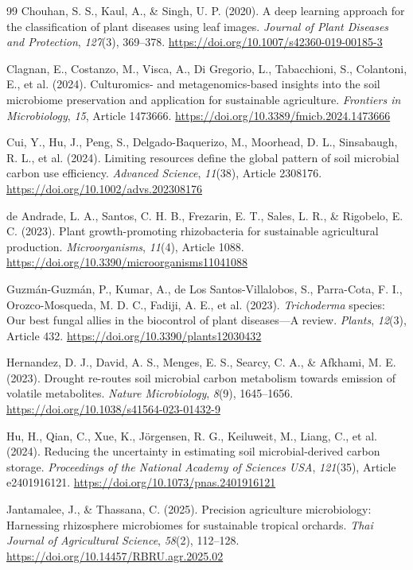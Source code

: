 \begin{thebibliography}{99}
 Chouhan, S. S., Kaul, A., \& Singh, U. P. (2020). A deep learning approach for the classification of plant diseases using leaf images. \textit{Journal of Plant Diseases and Protection}, \textit{127}(3), 369--378. \url{https://doi.org/10.1007/s42360-019-00185-3}

 Clagnan, E., Costanzo, M., Visca, A., Di Gregorio, L., Tabacchioni, S., Colantoni, E., et al. (2024). Culturomics- and metagenomics-based insights into the soil microbiome preservation and application for sustainable agriculture. \textit{Frontiers in Microbiology}, \textit{15}, Article 1473666. \url{https://doi.org/10.3389/fmicb.2024.1473666}

 Cui, Y., Hu, J., Peng, S., Delgado-Baquerizo, M., Moorhead, D. L., Sinsabaugh, R. L., et al. (2024). Limiting resources define the global pattern of soil microbial carbon use efficiency. \textit{Advanced Science}, \textit{11}(38), Article 2308176. \url{https://doi.org/10.1002/advs.202308176}

 de Andrade, L. A., Santos, C. H. B., Frezarin, E. T., Sales, L. R., \& Rigobelo, E. C. (2023). Plant growth-promoting rhizobacteria for sustainable agricultural production. \textit{Microorganisms}, \textit{11}(4), Article 1088. \url{https://doi.org/10.3390/microorganisms11041088}

 Guzmán-Guzmán, P., Kumar, A., de Los Santos-Villalobos, S., Parra-Cota, F. I., Orozco-Mosqueda, M. D. C., Fadiji, A. E., et al. (2023). \textit{Trichoderma} species: Our best fungal allies in the biocontrol of plant diseases---A review. \textit{Plants}, \textit{12}(3), Article 432. \url{https://doi.org/10.3390/plants12030432}

 Hernandez, D. J., David, A. S., Menges, E. S., Searcy, C. A., \& Afkhami, M. E. (2023). Drought re-routes soil microbial carbon metabolism towards emission of volatile metabolites. \textit{Nature Microbiology}, \textit{8}(9), 1645--1656. \url{https://doi.org/10.1038/s41564-023-01432-9}

 Hu, H., Qian, C., Xue, K., Jörgensen, R. G., Keiluweit, M., Liang, C., et al. (2024). Reducing the uncertainty in estimating soil microbial-derived carbon storage. \textit{Proceedings of the National Academy of Sciences USA}, \textit{121}(35), Article e2401916121. \url{https://doi.org/10.1073/pnas.2401916121}

 Jantamalee, J., \& Thassana, C. (2025). Precision agriculture microbiology: Harnessing rhizosphere microbiomes for sustainable tropical orchards. \textit{Thai Journal of Agricultural Science}, \textit{58}(2), 112--128. \url{https://doi.org/10.14457/RBRU.agr.2025.02}


\end{thebibliography}
